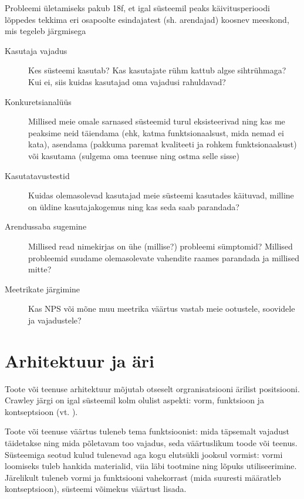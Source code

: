 Probleemi ületamiseks pakub 18f, et igal süsteemil peaks käivitusperioodi lõppedes tekkima eri osapoolte esindajatest (sh. arendajad) koosnev meeskond, mis tegeleb järgmisega
\begin{description}
	\item[Kasutaja vajadus] Kes süsteemi kasutab? Kas kasutajate rühm kattub algse sihtrühmaga? Kui ei, siis kuidas kasutajad oma vajadusi rahuldavad?
	\item[Konkuretsianalüüs] Millised meie omale sarnased süsteemid turul eksisteerivad ning kas me peaksime neid täiendama (ehk, katma funktsionaalsust, mida nemad ei kata), asendama (pakkuma paremat kvaliteeti ja rohkem funktsionaalsust) või kasutama (sulgema oma teenuse ning ostma selle sisse)
	\item[Kasutatavustestid] Kuidas olemasolevad kasutajad meie süsteemi kasutades käituvad, milline on üldine kasutajakogemus ning kas seda saab parandada?
	\item[Arendussaba sugemine] Millised read nimekirjas on ühe (millise?) probleemi sümptomid? Millised probleemid suudame olemasolevate vahendite raames parandada ja millised mitte?
	\item[Meetrikate järgimine] Kas NPS või mõne muu meetrika väärtus vastab meie ootustele, soovidele ja vajadustele?
\end{description}

\section{Arhitektuur ja äri}
Toote või teenuse arhitektuur mõjutab otseselt orgranisatsiooni ärilist positsiooni. Crawley järgi on igal süsteemil kolm olulist aspekti: vorm, funktsioon ja kontseptsioon (vt. ).

Toote või teenuse väärtus tuleneb tema funktsioonist: mida täpsemalt vajadust täidetakse ning mida põletavam too vajadus, seda väärtuslikum toode või teenus. Süsteemiga seotud kulud tulenevad aga kogu elutsükli jooksul vormist: vormi loomiseks tuleb hankida materialid, viia läbi tootmine ning lõpuks utiliseerimine. Järelikult tuleneb vormi ja funktsiooni vahekorrast (mida suuresti määratleb kontseptsioon), süsteemi võimekus väärtust lisada. 

